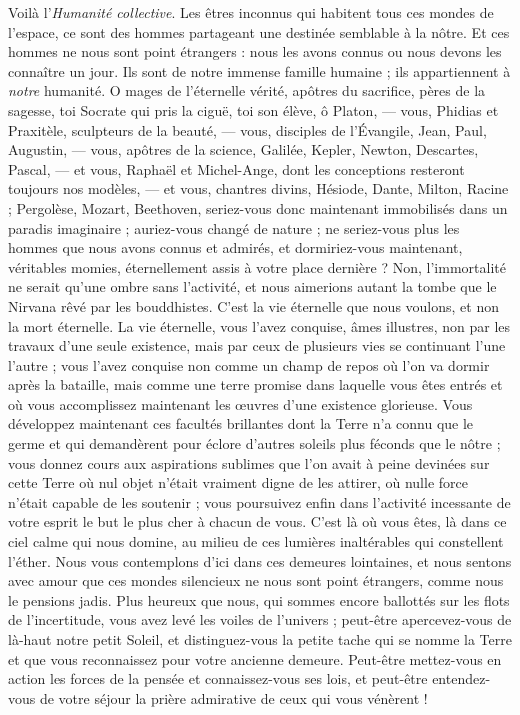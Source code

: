 \documentclass[a4paper, 11pt, oneside]{article}
\begin{document}
Voilà l'\emph{Humanité collective}. Les êtres inconnus qui habitent tous ces mondes de l'espace, ce sont des hommes partageant une destinée semblable à la nôtre. Et ces hommes ne nous sont point étrangers : nous les avons connus ou nous devons les connaître un jour. Ils sont de notre immense famille humaine ; ils appartiennent à \emph{notre} humanité. O mages de l'éternelle vérité, apôtres du sacrifice, pères de la sagesse, toi Socrate qui pris la ciguë, toi son élève, ô Platon, --- vous, Phidias et Praxitèle, sculpteurs de la beauté, --- vous, disciples de l'Évangile, Jean, Paul, Augustin, --- vous, apôtres de la science, Galilée, Kepler, Newton, Descartes, Pascal, --- et vous, Raphaël et Michel-Ange, dont les conceptions resteront toujours nos modèles, --- et vous, chantres divins, Hésiode, Dante, Milton, Racine ; Pergolèse, Mozart, Beethoven, seriez-vous donc maintenant immobilisés dans un paradis imaginaire ; auriez-vous changé de nature ; ne seriez-vous plus les hommes que nous avons connus et admirés, et dormiriez-vous maintenant, véritables momies, éternellement assis à votre place dernière ? Non, l'immortalité ne serait qu'une ombre sans l'activité, et nous aimerions autant la tombe que le Nirvana rêvé par les bouddhistes. C'est la vie éternelle que nous voulons, et non la mort éternelle. La vie éternelle, vous l'avez conquise, âmes illustres, non par les travaux d'une seule existence, mais par ceux de plusieurs vies se continuant l'une l'autre ; vous l'avez conquise non comme un champ de repos où l'on va dormir après la bataille, mais comme une terre promise dans laquelle vous êtes entrés et où vous accomplissez maintenant les œuvres d'une existence glorieuse. Vous développez maintenant ces facultés brillantes dont la Terre n'a connu que le germe et qui demandèrent pour éclore d'autres soleils plus féconds que le nôtre ; vous donnez cours aux aspirations sublimes que l'on avait à peine devinées sur cette Terre où nul objet n'était vraiment digne de les attirer, où nulle force n'était capable de les soutenir ; vous poursuivez enfin dans l'activité incessante de votre esprit le but le plus cher à chacun de vous. C'est là où vous êtes, là dans ce ciel calme qui nous domine, au milieu de ces lumières inaltérables qui constellent l'éther. Nous vous contemplons d'ici dans ces demeures lointaines, et nous sentons avec amour que ces mondes silencieux ne nous sont point étrangers, comme nous le pensions jadis. Plus heureux que nous, qui sommes encore ballottés sur les flots de l'incertitude, vous avez levé les voiles de l'univers ; peut-être apercevez-vous de là-haut notre petit Soleil, et distinguez-vous la petite tache qui se nomme la Terre et que vous reconnaissez pour votre ancienne demeure. Peut-être mettez-vous en action les forces de la pensée et connaissez-vous ses lois, et peut-être entendez-vous de votre séjour la prière admirative de ceux qui vous vénèrent !
\end{document}
